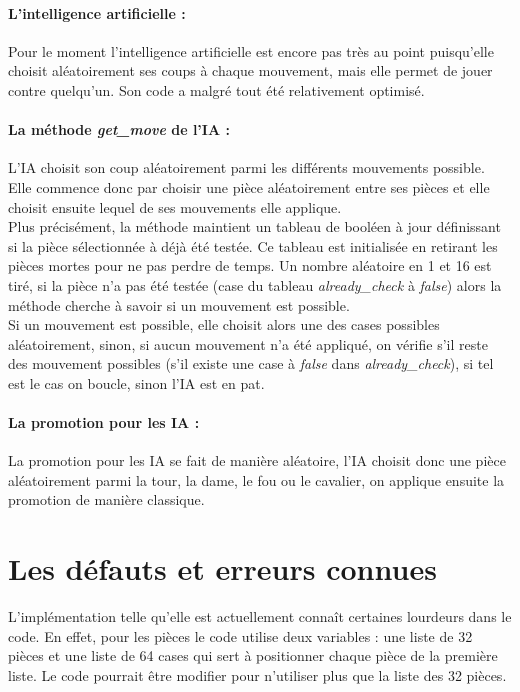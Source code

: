 \documentclass[a4paper]{article}
\begin{document}
\paragraph{L'intelligence artificielle :}Pour le moment l'intelligence artificielle est encore pas très au point puisqu'elle choisit aléatoirement ses coups à chaque mouvement, mais elle permet de jouer contre quelqu'un. Son code a malgré tout été relativement optimisé. 

\paragraph{La méthode \textit{get\_move} de l'IA :}L'IA choisit son coup aléatoirement parmi les différents mouvements possible. Elle commence donc par choisir une pièce aléatoirement entre ses pièces et elle choisit ensuite lequel de ses mouvements elle applique. \\ 

Plus précisément, la méthode maintient un tableau de booléen à jour définissant si la pièce sélectionnée à déjà été testée. Ce tableau est initialisée en retirant les pièces mortes pour ne pas perdre de temps. Un nombre aléatoire en 1 et 16 est tiré, si la pièce n'a pas été testée (case du tableau \textit{already\_check} à \textit{false}) alors la méthode cherche à savoir si un mouvement est possible. \\

Si un mouvement est possible, elle choisit alors une des cases possibles aléatoirement, sinon, si aucun mouvement n'a été appliqué, on vérifie s'il reste des mouvement possibles (s'il existe une case à \textit{false} dans \textit{already\_check}), si tel est le cas on boucle, sinon l'IA est en pat. 

\paragraph{La promotion pour les IA :}La promotion pour les IA se fait de manière aléatoire, l'IA choisit donc une pièce aléatoirement parmi la tour, la dame, le fou ou le cavalier, on applique ensuite la promotion de manière classique.

\section{Les défauts et erreurs connues}

L'implémentation telle qu'elle est actuellement connaît certaines lourdeurs dans le code. En effet, pour les pièces le code utilise deux variables : une liste de 32 pièces et une liste de 64 cases qui sert à positionner chaque pièce de la première liste. Le code pourrait être modifier pour n'utiliser plus que la liste des 32 pièces. \\
\end{document}
